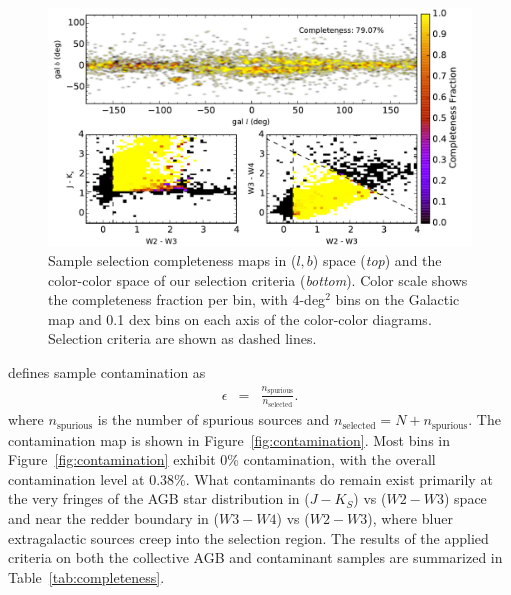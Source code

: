 \begin{figure}[h]
\includegraphics[width=6.7in]{figs/completeness_map.pdf}
\caption{Sample selection completeness maps in ($l,b$) space (\emph{top}) and the color-color space of our selection criteria (\emph{bottom}). Color scale shows the completeness fraction per bin, with 4-deg$^2$ bins on the Galactic map and 0.1 dex bins on each axis of the color-color diagrams. Selection criteria are shown as dashed lines.\label{fig:completeness}}
\end{figure}

\cite{2013sdmm.book.....I} defines sample contamination as
\begin{eqnarray*}
\epsilon &=& \frac{n_\text{spurious}}{n_\text{selected}}.
\end{eqnarray*}
where $n_\text{spurious}$ is the number of spurious sources and $n_\text{selected} = N + n_\text{spurious}$. The contamination map is shown in Figure~\ref{fig:contamination}. Most bins in Figure~\ref{fig:contamination} exhibit 0\% contamination, with the overall contamination level at 0.38\%. What contaminants do remain exist primarily at the very fringes of the AGB star distribution in ($J-K_S$) vs ($W2 - W3$) space and near the redder boundary in ($W3-W4$) vs ($W2 - W3$), where bluer extragalactic sources creep into the selection region. The results of the applied criteria on both the collective AGB and contaminant samples are summarized in Table~\ref{tab:completeness}. 

